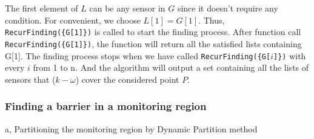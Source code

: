 
The first element of $L$ can be any sensor in $G$ since it doesn't require any condition. For convenient, we choose $L[1]=G[1]$. Thus, {\tt RecurFinding(\{G[1]\})} is called to start the finding process. After function call {\tt RecurFinding(\{G[1]\})}, the function will return all the satisfied lists containing G[1]. The finding process stops when we have called {\tt RecurFinding(\{G[$i$]\})} with every $i$ from 1 to n. And the algorithm will output a set containing all the lists of sensors that ($k-\omega$) cover the considered point $P$.

\subsubsection{Finding a barrier in a monitoring region}


a, Partitioning the monitoring region by Dynamic Partition method

\label{subsection1}

